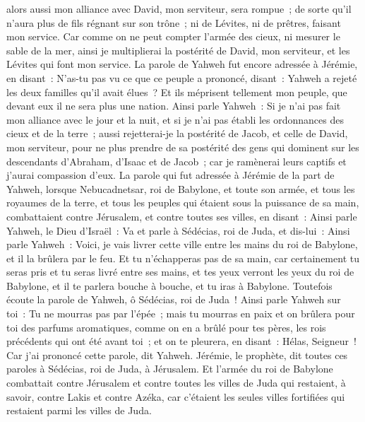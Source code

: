 \begin{multicols}{2}
alors aussi mon alliance avec David, mon serviteur, sera rompue~; de sorte qu'il n'aura plus de fils régnant sur son trône~; ni de Lévites, ni de prêtres, faisant mon service.
Car comme on ne peut compter l'armée des cieux, ni mesurer le sable de la mer, ainsi je multiplierai la postérité de David, mon serviteur, et les Lévites qui font mon service.
La parole de Yahweh fut encore adressée à Jérémie, en disant~:
N'as-tu pas vu ce que ce peuple a prononcé, disant~: Yahweh a rejeté les deux familles qu'il avait élues~? Et ils méprisent tellement mon peuple, que devant eux il ne sera plus une nation. 
Ainsi parle Yahweh~: Si je n'ai pas fait mon alliance avec le jour et la nuit, et si je n'ai pas établi les ordonnances des cieux et de la terre~;
aussi rejetterai-je la postérité de Jacob, et celle de David, mon serviteur, pour ne plus prendre de sa postérité des gens qui dominent sur les descendants d'Abraham, d'Isaac et de Jacob~; car je ramènerai leurs captifs et j'aurai compassion d'eux.
\VerseOne{}La parole qui fut adressée à Jérémie de la part de Yahweh, lorsque Nebucadnetsar, roi de Babylone, et toute son armée, et tous les royaumes de la terre, et tous les peuples qui étaient sous la puissance de sa main, combattaient contre Jérusalem, et contre toutes ses villes, en disant~:
Ainsi parle Yahweh, le Dieu d'Israël~: Va et parle à Sédécias, roi de Juda, et dis-lui~: Ainsi parle Yahweh~: Voici, je vais livrer cette ville entre les mains du roi de Babylone, et il la brûlera par le feu.
Et tu n'échapperas pas de sa main, car certainement tu seras pris et tu seras livré entre ses mains, et tes yeux verront les yeux du roi de Babylone, et il te parlera bouche à bouche, et tu iras à Babylone.
Toutefois écoute la parole de Yahweh, ô Sédécias, roi de Juda~! Ainsi parle Yahweh sur toi~: Tu ne mourras pas par l'épée~;
mais tu mourras en paix et on brûlera pour toi des parfums aromatiques, comme on en a brûlé pour tes pères, les rois précédents qui ont été avant toi~; et on te pleurera, en disant~: Hélas, Seigneur~! Car j'ai prononcé cette parole, dit Yahweh.
Jérémie, le prophète, dit toutes ces paroles à Sédécias, roi de Juda, à Jérusalem.
Et l'armée du roi de Babylone combattait contre Jérusalem et contre toutes les villes de Juda qui restaient, à savoir, contre Lakis et contre Azéka, car c'étaient les seules villes fortifiées qui restaient parmi les villes de Juda.

\end{multicols}
